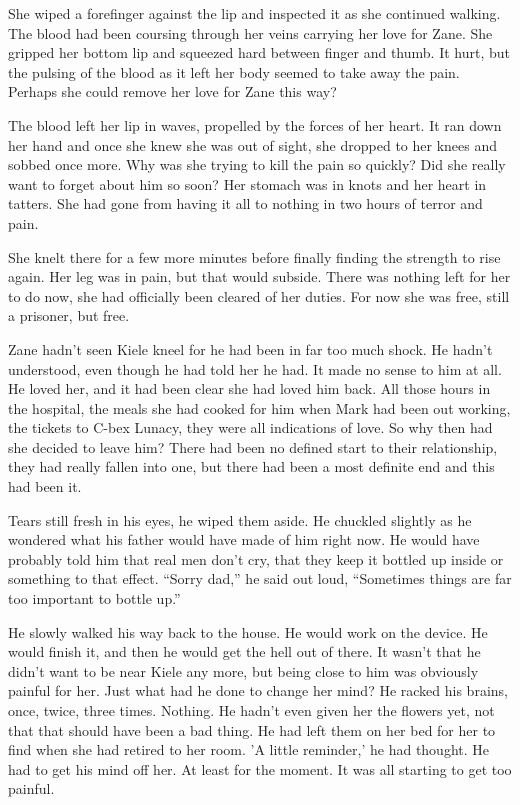 She wiped a forefinger against the lip and inspected it as she continued walking.  The blood had been coursing through her veins carrying her love for Zane.  She gripped her bottom lip and squeezed hard between finger and thumb.  It hurt, but the pulsing of the blood as it left her body seemed to take away the pain.  Perhaps she could remove her love for Zane this way?  

The blood left her lip in waves, propelled by the forces of her heart.  It ran down her hand and once she knew she was out of sight, she dropped to her knees and sobbed once more.  Why was she trying to kill the pain so quickly?  Did she really want to forget about him so soon?  Her stomach was in knots and her heart in tatters.  She had gone from having it all to nothing in two hours of terror and pain.

She knelt there for a few more minutes before finally finding the strength to rise again.  Her leg was in pain, but that would subside.  There was nothing left for her to do now, she had officially been cleared of her duties.  For now she was free, still a prisoner, but free.



\thoughtbreak



Zane hadn't seen Kiele kneel for he had been in far too much shock.  He hadn't understood, even though he had told her he had.  It made no sense to him at all.  He loved her, and it had been clear she had loved him back.  All those hours in the hospital, the meals she had cooked for him when Mark had been out working, the tickets to C-bex Lunacy, they were all indications of love.  So why then had she decided to leave him?  There had been no defined start to their relationship, they had really fallen into one, but there had been a most definite end and this had been it.

Tears still fresh in his eyes, he wiped them aside.  He chuckled slightly as he wondered what his father would have made of him right now.  He would have probably told him that real men don't cry, that they keep it bottled up inside or something to that effect.  ``Sorry dad,'' he said out loud, ``Sometimes things are far too important to bottle up.''

He slowly walked his way back to the house.  He would work on the device.  He would finish it, and then he would get the hell out of there.  It wasn't that he didn't want to be near Kiele any more, but being close to him was obviously painful for her.  Just what had he done to change her mind?  He racked his brains, once, twice, three times.  Nothing.  He hadn't even given her the flowers yet, not that that should have been a bad thing.  He had left them on her bed for her to find when she had retired to her room.  'A little reminder,' he had thought.  He had to get his mind off her.  At least for the moment.  It was all starting to get too painful.

